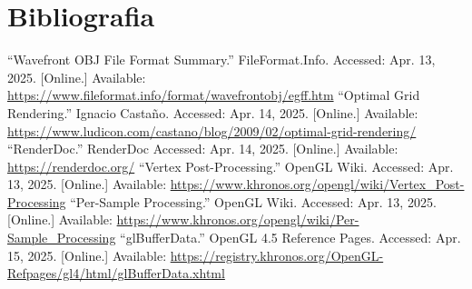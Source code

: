 \documentclass[12pt, a4paper]{article}
\begin{document}
\begingroup
\section{Bibliografia}
\renewcommand{\section}[2]{}

\begin{thebibliography}{9}
        ``Wavefront OBJ File Format Summary.'' FileFormat.Info. Accessed: Apr. 13, 2025. [Online.]
        Available: \url{https://www.fileformat.info/format/wavefrontobj/egff.htm}
        ``Optimal Grid Rendering.'' Ignacio Castaño. Accessed: Apr. 14, 2025. [Online.] Available:
        \url{https://www.ludicon.com/castano/blog/2009/02/optimal-grid-rendering/}
        ``RenderDoc.'' RenderDoc Accessed: Apr. 14, 2025. [Online.] Available:
        \url{https://renderdoc.org/}
        ``Vertex Post-Processing.'' OpenGL Wiki. Accessed: Apr. 13, 2025. [Online.] Available:
        \url{https://www.khronos.org/opengl/wiki/Vertex_Post-Processing}
        ``Per-Sample Processing.'' OpenGL Wiki. Accessed: Apr. 13, 2025. [Online.] Available:
        \url{https://www.khronos.org/opengl/wiki/Per-Sample_Processing}
        ``glBufferData.'' OpenGL 4.5 Reference Pages. Accessed: Apr. 15, 2025. [Online.] Available:
        \url{https://registry.khronos.org/OpenGL-Refpages/gl4/html/glBufferData.xhtml}
\end{thebibliography}
\endgroup
\end{document}
